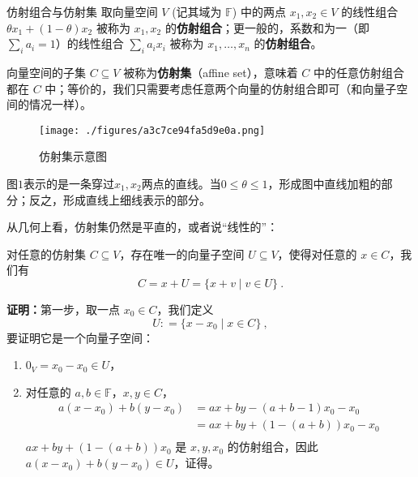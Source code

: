 
\begin{issues}
\issueTODO
\end{issues}



\begin{definition}{仿射组合与仿射集}\label{def_AffSet_1}
取向量空间 $V$ (记其域为 $\mathbb{F}$) 中的两点 $x_1, x_2 \in V$ 的线性组合 $\theta x_1 + (1 - \theta) x_2$ 被称为 $x_1, x_2$ 的\textbf{仿射组合}；更一般的，系数和为一（即$\sum_i a_i = 1$）的线性组合 $\sum_i a_i x_i$ 被称为 $x_1, \dots, x_n$ 的\textbf{仿射组合}。

向量空间的子集 $C \subseteq V$ 被称为\textbf{仿射集}（affine set），意味着 $C$ 中的任意仿射组合都在 $C$ 中；等价的，我们只需要考虑任意两个向量的仿射组合即可（和向量子空间的情况一样）。
\end{definition}

\begin{figure}[ht]
\centering
\texttt{[image: ./figures/a3c7ce94fa5d9e0a.png]}
\caption{仿射集示意图} \label{fig_AffSet_1}
\end{figure}

图$1$表示的是一条穿过$x_1,x_2$两点的直线。当$0 \leq \theta \leq 1$，形成图中直线加粗的部分；反之，形成直线上细线表示的部分。

从几何上看，仿射集仍然是平直的，或者说“线性的”：

\begin{theorem}{}
对任意的仿射集 $C \subseteq V$，存在唯一的向量子空间 $U \subseteq V$，使得对任意的 $x \in C$，我们有
\begin{equation}
C = x + U = \{ x + v \mid v \in U\}~.
\end{equation}
\end{theorem}

\textbf{证明：}第一步，取一点 $x_0 \in C$，我们定义
\begin{equation}
U: = \{ x - x_0 \mid x \in C \}~,
\end{equation}
要证明它是一个向量子空间：
\begin{enumerate}
\item $0_V = x_0 - x_0 \in U$，
\item 对任意的 $a, b \in \mathbb{F}$，$x, y \in C$，
    \begin{equation}
    \begin{aligned}
    a (x - x_0) + b (y - x_0) &= a x + b y - (a + b - 1) x_0 - x_0 \\
    &= a x + b y + (1 - (a + b)) x_0 - x_0 \\
    \end{aligned}~
    \end{equation}
$a x + b y + (1 - (a + b)) x_0$ 是 $x, y, x_0$ 的仿射组合，因此 $a (x - x_0) + b (y - x_0) \in U$，证得。
\end{enumerate}

